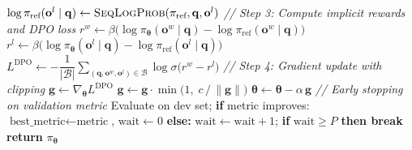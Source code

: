 \documentclass[11pt]{article}
\begin{document}
\begin{algorithm}[t]
\begin{algorithmic}[1]
        \State $\log \pi_{\text{ref}}(\mathbf{o}^l \mid \mathbf{q}) \gets \Call{SeqLogProb}{\pi_{\text{ref}}, \mathbf{q}, \mathbf{o}^l}$
        \Statex \hspace{\algorithmicindent}\hspace{\algorithmicindent}\textit{// Step 3: Compute implicit rewards and DPO loss}
        \State $r^w \gets \beta \big(\log \pi_{\boldsymbol{\theta}}(\mathbf{o}^w \mid \mathbf{q}) - \log \pi_{\text{ref}}(\mathbf{o}^w \mid \mathbf{q})\big)$
        \State $r^l \gets \beta \big(\log \pi_{\boldsymbol{\theta}}(\mathbf{o}^l \mid \mathbf{q}) - \log \pi_{\text{ref}}(\mathbf{o}^l \mid \mathbf{q})\big)$
        \State $L^{\text{DPO}} \gets -\dfrac{1}{|\mathcal{B}|} \displaystyle\sum_{(\mathbf{q}, \mathbf{o}^w, \mathbf{o}^l) \in \mathcal{B}} \log \sigma\!\big(r^w - r^l\big)$
        \Statex \hspace{\algorithmicindent}\hspace{\algorithmicindent}\textit{// Step 4: Gradient update with clipping}
        \State $\mathbf{g} \gets \nabla_{\boldsymbol{\theta}} L^{\text{DPO}}$
        \State $\mathbf{g} \gets \mathbf{g} \cdot \min\!\big(1,\; c \,/\, \|\mathbf{g}\|\big)$
        \State $\boldsymbol{\theta} \gets \boldsymbol{\theta} - \alpha\, \mathbf{g}$
    \EndFor
    \Statex \hspace{\algorithmicindent}\textit{// Early stopping on validation metric}
    \State Evaluate on dev set; \textbf{if} metric improves: $\text{best\_metric} \gets \text{metric}$, $\text{wait} \gets 0$
    \State \textbf{else:} $\text{wait} \gets \text{wait} + 1$;
        \textbf{if} $\text{wait} \geq P$ \textbf{then break}
\EndFor
\State \textbf{return} $\pi_{\boldsymbol{\theta}}$
\end{algorithmic}
\end{algorithm}
\end{document}
